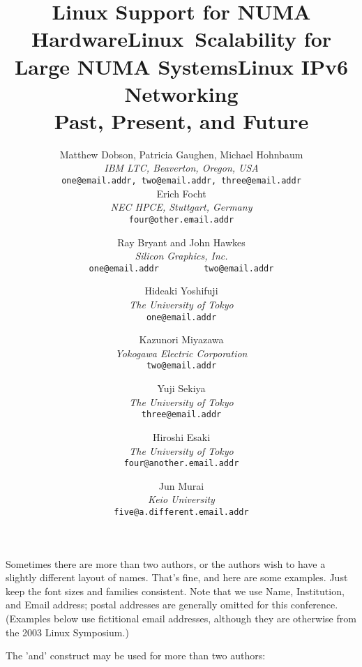
Sometimes there are more than two authors, or the authors wish to have
a slightly different layout of names.  That's fine, and here are some
examples.  Just keep the font sizes and families consistent.
Note that we use Name, Institution, and Email address; postal addresses
are generally omitted for this conference.  (Examples below use
fictitional email addresses, although they are otherwise from
the 2003 Linux Symposium.)


\title{Linux Support for NUMA Hardware}

\author{
Matthew Dobson, Patricia Gaughen, Michael Hohnbaum \\
{\em IBM LTC, Beaverton, Oregon, USA}\\
{\tt\normalsize one@email.addr, two@email.addr, three@email.addr} \\
%
\smallskip
Erich Focht \\
{\em NEC HPCE, Stuttgart, Germany}\\
{\tt\normalsize four@other.email.addr}
} %

\maketitle


\title{Linux\textregistered ~Scalability for Large NUMA Systems}

\author{
Ray Bryant and John Hawkes \\
{\em Silicon Graphics, Inc.}\\
{\tt\normalsize one@email.addr ~~~~~~~ two@email.addr}\\
} %
     
\maketitle


The 'and' construct may be used for more than two authors:

\title{Linux IPv6 Networking \\
{\normalsize Past, Present, and Future}}

\author{
Hideaki Yoshifuji \\
{\em The University of Tokyo}\\
{\tt\normalsize one@email.addr} \\
\and
Kazunori Miyazawa \\
{\em Yokogawa Electric Corporation} \\
{\tt\normalsize two@email.addr} \\
\and
Yuji Sekiya \\
{\em The University of Tokyo}\\
{\tt\normalsize three@email.addr} \\
\and
Hiroshi Esaki \\
{\em The University of Tokyo}\\
{\tt\normalsize four@another.email.addr}
\and
Jun Murai \\
{\em Keio University}\\
{\tt\normalsize five@a.different.email.addr}
} 

\maketitle


